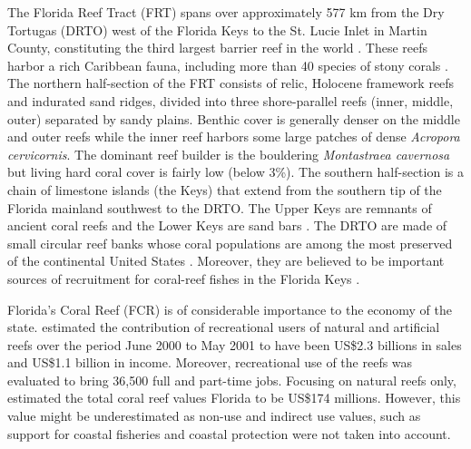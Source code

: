 The Florida Reef Tract (FRT) spans over approximately 577 km from the Dry Tortugas (DRTO) west of the Florida Keys to the St. Lucie Inlet in Martin County, constituting the third largest barrier reef in the world \citep{finkl2008shelf}. These reefs harbor a rich Caribbean fauna, including more than 40 species of stony corals \citep{banks2008reef,jackson2014status}. The northern half-section of the FRT consists of relic, Holocene framework reefs and indurated sand ridges, divided into three shore-parallel reefs (inner, middle, outer) separated by sandy plains. Benthic cover is generally denser on the middle and outer reefs while the inner reef harbors some large patches of dense \textit{Acropora cervicornis}. The dominant reef builder is the bouldering \textit{Montastraea cavernosa} but living hard coral cover is fairly low (below 3\%)\citep{banks2008reef,walton2018impacts}. The southern half-section is a chain of limestone islands (the Keys) that extend from the southern tip of the Florida mainland southwest to the DRTO. The Upper Keys are remnants of ancient coral reefs and the Lower Keys are sand bars \citep{hoffmeister1968geology}. The DRTO are made of small circular reef banks whose coral populations are among the most preserved of the continental United States \citep{hine2008coral, kourafalou2018physical}. Moreover, they are believed to be important sources of recruitment for coral-reef fishes in the Florida Keys \citep{domeier2004potential}. 


Florida's Coral Reef (FCR) is of considerable importance to the economy of the state. \cite{johns2003socio} estimated the contribution of recreational users of natural and artificial reefs over the period June 2000 to May 2001 to have been US\$2.3 billions in sales and US\$1.1 billion in income. Moreover, recreational use of the reefs was evaluated to bring 36,500 full and part-time jobs. Focusing on natural reefs only, \cite{brander2013total} estimated the total coral reef values Florida to be US\$174 millions. However, this value might be underestimated as non-use and indirect use values, such as support for coastal fisheries \citep{ault2006building} and coastal protection \citep{ferrario2014effectiveness} were not taken into account.

